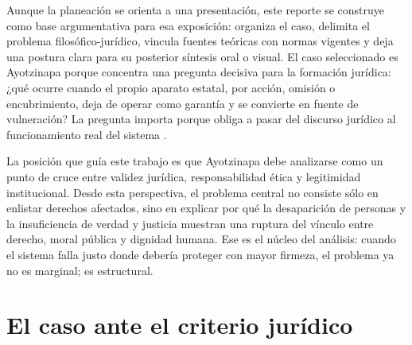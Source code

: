 \documentclass[
	spanish,
	letterpaper, oneside
]{article}
\begin{document}
Aunque la planeación se orienta a una presentación, este reporte se construye como base argumentativa para esa exposición: organiza el caso, delimita el problema filosófico-jurídico, vincula fuentes teóricas con normas vigentes y deja una postura clara para su posterior síntesis oral o visual. El caso seleccionado es Ayotzinapa porque concentra una pregunta decisiva para la formación jurídica: ¿qué ocurre cuando el propio aparato estatal, por acción, omisión o encubrimiento, deja de operar como garantía y se convierte en fuente de vulneración? La pregunta importa porque obliga a pasar del discurso jurídico al funcionamiento real del sistema \citep{cpeum2026,casoAyotzinapaCNDH2024}.

La posición que guía este trabajo es que Ayotzinapa debe analizarse como un punto de cruce entre validez jurídica, responsabilidad ética y legitimidad institucional. Desde esta perspectiva, el problema central no consiste sólo en enlistar derechos afectados, sino en explicar por qué la desaparición de personas y la insuficiencia de verdad y justicia muestran una ruptura del vínculo entre derecho, moral pública y dignidad humana. Ese es el núcleo del análisis: cuando el sistema falla justo donde debería proteger con mayor firmeza, el problema ya no es marginal; es estructural.

%
%
\section{El caso ante el criterio jurídico}
\end{document}
